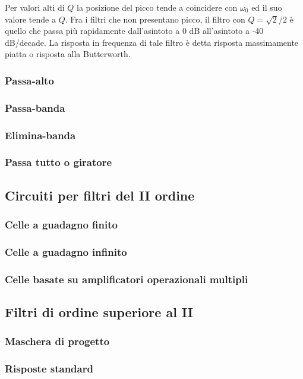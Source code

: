 \documentclass[../main.tex]{subfiles}
\begin{document}
Per valori alti di $Q$ la posizione del picco tende a coincidere con $\omega_0$ ed il suo valore tende a $Q$. Fra i filtri che non presentano picco, il filtro con $Q = \sqrt{2} / 2$ è quello che passa più rapidamente dall’asintoto a 0 dB all’asintoto a -40 dB/decade. La risposta in frequenza di tale filtro è detta risposta massimamente piatta o risposta alla Butterworth.

\subsubsection{Passa-alto}
\subsubsection{Passa-banda}
\subsubsection{Elimina-banda}
\subsubsection{Passa tutto o giratore}

\subsection{Circuiti per filtri del II ordine}
\subsubsection{Celle a guadagno finito}
\subsubsection{Celle a guadagno infinito}
\subsubsection{Celle basate su amplificatori operazionali multipli}

\subsection{Filtri di ordine superiore al II}
\subsubsection{Maschera di progetto }
\subsubsection{Risposte standard}
\end{document}
